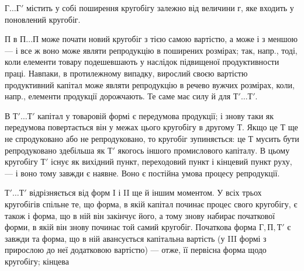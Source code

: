 $Г\dots{} Г'$ містить у собі поширення кругобігу залежно від величини $г$, яке
входить у поновлений кругобіг.

$П$ в $П\dots{} П$ може почати новий кругобіг з тією самою вартістю, а може і з меншою — і все ж воно може
являти репродукцію в поширених розмірах; так, напр., тоді, коли елементи товару подешевшають у
наслідок підвищеної продуктивности праці. Навпаки, в протилежному випадку, вирослий своєю вартістю
продуктивний капітал може являти репродукцію в речево вужчих розмірах, коли, напр., елементи
продукції дорожчають. Те саме має силу й для $Т'\dots{} Т'$.

В $Т'\dots{} Т'$ капітал у товаровій формі є передумова продукції; і знову таки як передумова повертається
він у межах цього кругобігу в другому $Т$. Якщо це $Т$ ще не спродуковано або не репродуковано, то
кругобіг зупиняється: це $Т$ мусить бути репродуковано здебільша як $Т'$ якогось іншого промислового
капіталу. В цьому кругобігу $Т'$ існує як вихідний пункт, переходовий пункт і кінцевий пункт руху, — і
воно тому завжди є наявне. Воно є постійна умова процесу репродукції.

$Т'\dots{} Т'$ відрізняється від форм I і II ще й іншим моментом. У всіх трьох кругобігів спільне те, що
форма, в якій капітал починає процес свого кругобігу, є також і форма, що в ній він закінчує його, а
тому знову набирає початкової форми, в якій він знову починає той самий кругобіг. Початкова форма $Г,
П, Т'$ є завжди та форма, що в ній авансується капітальна вартість (у III формі з прирослою до неї
додатковою вартістю) — отже, її первісна форма щодо кругобігу; кінцева
\parbreak{}  %
